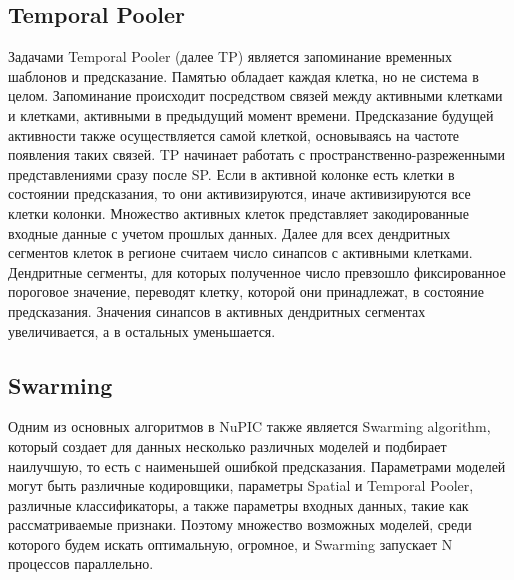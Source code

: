 \subsection{Temporal Pooler}
Задачами Temporal Pooler  (далее TP) является запоминание временных шаблонов и предсказание. Памятью обладает каждая клетка, но не система в целом. 
Запоминание происходит посредством связей между активными клетками и клетками, активными в предыдущий момент времени. Предсказание будущей активности также осуществляется самой клеткой, основываясь на частоте появления таких связей. 
TP начинает работать с пространственно-разреженными представлениями сразу после SP. Если в активной колонке есть клетки в состоянии предсказания, то они активизируются, иначе активизируются все клетки колонки. Множество активных клеток представляет закодированные входные данные с учетом прошлых данных. Далее для всех дендритных сегментов клеток в регионе считаем число синапсов с активными клетками. Дендритные сегменты, для которых полученное число превзошло  фиксированное пороговое значение, переводят клетку, которой они принадлежат, в состояние предсказания. Значения синапсов в активных дендритных сегментах увеличивается, а в остальных уменьшается.


\subsection{Swarming} 
Одним из основных алгоритмов в NuPIC также является Swarming algorithm, который создает для данных несколько различных моделей и подбирает наилучшую, то есть с наименьшей ошибкой предсказания. Параметрами моделей могут быть различные кодировщики, параметры Spatial и Temporal Pooler, различные классификаторы, а также параметры входных данных, такие как рассматриваемые признаки. Поэтому множество возможных моделей, среди которого будем искать оптимальную, огромное, и Swarming запускает N процессов параллельно.